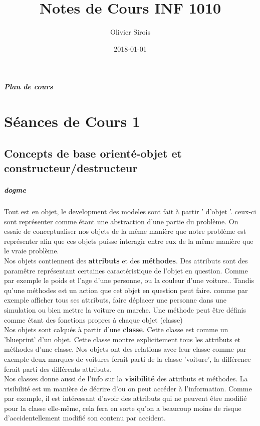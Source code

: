 \documentclass[oneside]{book}
\title{Notes de Cours INF 1010}
\date{2018-01-01}
\author{Olivier Sirois}
\begin{document}
\setcounter{page}{1}
\maketitle
\tableofcontents

\paragraph{Plan de cours}
\chapter{Séances de Cours 1}
\section{Concepts de base orienté-objet et constructeur/destructeur}
\paragraph{dogme} Tout est en objet, le development des modeles sont fait à partir ' d'objet '. ceux-ci sont représenter comme étant une abstraction d'une partie du problème. On essaie de conceptualiser nos objets de la même manière que notre problème est représenter afin que ces objets puisse interagir entre eux de la même manière que le vraie problème.\\

Nos objets contiennent des \textbf{attributs} et des \textbf{méthodes}. Des attributs sont des paramêtre représentant certaines caractéristique de l'objet en question. Comme par exemple le poids et l'age d'une personne, ou la couleur d'une voiture.. Tandis qu'une méthodes est un action que cet objet en question peut faire. comme par exemple afficher tous ses attributs, faire déplacer une personne dans une simulation ou bien mettre la voiture en marche. Une méthode peut être définis comme étant des fonctions propres à chaque objet (classe)\\

Nos objets sont calqués à partir d'une \textbf{classe}. Cette classe est comme un 'blueprint' d'un objet. Cette classe montre explicitement tous les attributs et méthodes d'une classe. Nos objets ont des relations avec leur classe comme par exemple deux marques de voitures ferait parti de la classe 'voiture', la différence ferait parti des différents attributs. \\

Nos classes donne aussi de l'info sur la \textbf{visibilité} des attributs et méthodes. La visibilité est un manière de décrire d'ou on peut accéder à l'information. Comme par exemple, il est intéressant d'avoir des attributs qui ne peuvent être modifié pour la classe elle-même, cela fera en sorte qu'on a beaucoup moins de risque d'accidentellement modifié son contenu par accident. \\
\end{document}

